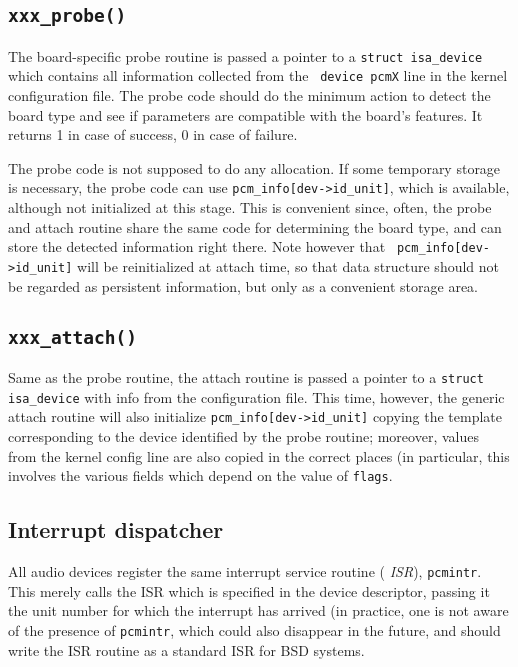 \documentclass[11pt]{article}
\begin{document}
\subsection{{\tt xxx\_probe()}}

The board-specific probe routine is passed a pointer to a {\tt struct
isa\_device} which contains all information collected from the {\tt
device pcmX} line in the kernel configuration file. The probe code
should do the minimum action to detect the board type and see if
parameters are compatible with the board's features. It returns 1 in
case of success, 0 in case of failure.

The probe code is
not supposed to do any allocation. If some temporary storage is
necessary, the probe code can use {\tt pcm\_info[dev->id\_unit]},
which is available, although not initialized at this stage. This
is convenient since, often, the probe and attach routine share the
same code for determining the board type, and can store the detected
information right there. Note however that {\tt
pcm\_info[dev->id\_unit]} will be reinitialized at attach time, so that
data structure should not be regarded as persistent information, but
only as a convenient storage area.

\subsection{{\tt xxx\_attach()}}

Same as the probe routine, the attach routine is passed a pointer
to a {\tt struct isa\_device} with info from the configuration
file. This time, however, the generic attach routine will also
initialize {\tt pcm\_info[dev->id\_unit]} copying the template
corresponding to the device identified by the probe routine;
moreover, values from the kernel config line are also copied in
the correct places (in particular, this involves the various fields
which depend on the value of {\tt flags}.

\subsection{Interrupt dispatcher}

All audio devices register the same interrupt service routine ({\em
ISR}), {\tt pcmintr}. This merely calls the ISR which is specified
in the device descriptor, passing it the unit number for which the
interrupt has arrived (in practice, one is not aware of the presence
of {\tt pcmintr}, which could also disappear in the future, and
should write the ISR routine as a standard ISR for BSD systems.
\end{document}
